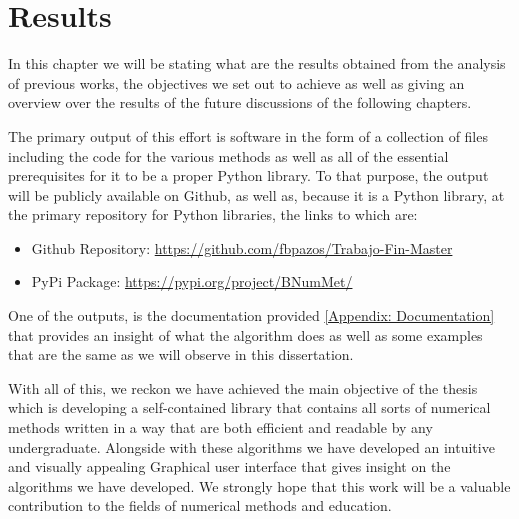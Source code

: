 \chapter{Results}
In this chapter we will be stating what are the results obtained from the analysis of previous works, the objectives we set out to achieve as well as giving an overview over the results of the future discussions of the following chapters.


The primary output of this effort is software in the form of a collection of files including the code for the various methods as well as all of the essential prerequisites for it to be a proper Python library. To that purpose, the output will be publicly available on Github, as well as, because it is a Python library, at the primary repository for Python libraries, the links to which are:

\begin{itemize}
    \item Github Repository: \href{https://github.com/fbpazos/Trabajo-Fin-Master}{https://github.com/fbpazos/Trabajo-Fin-Master}
    \item PyPi Package: \href{https://pypi.org/project/BNumMet/}{https://pypi.org/project/BNumMet/}
\end{itemize}


One of the outputs, is the documentation provided \hyperlink{Appendix:Documentation}{[Appendix: Documentation]} that provides an insight of what the algorithm does as well as some examples that are the same as we will observe in this dissertation.

With all of this, we reckon we have achieved the main objective of the thesis which is developing a self-contained library that contains all sorts of numerical methods written in a way that are both efficient and readable by any undergraduate. Alongside with these algorithms we have developed an intuitive and visually appealing Graphical user interface that gives insight on the algorithms we have developed. We strongly hope that this work will be a valuable contribution to the fields of numerical methods and education.